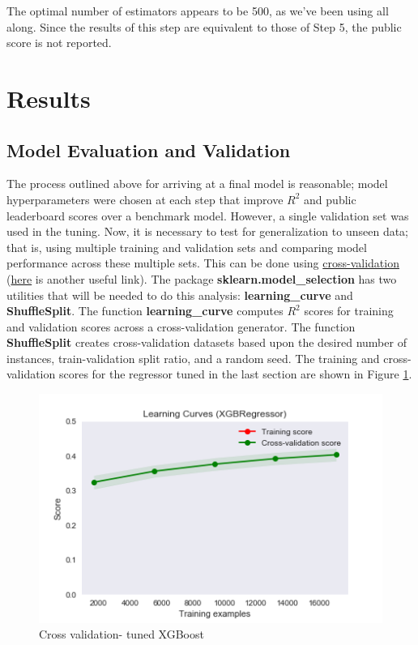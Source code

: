 \documentclass[12pt]{article}
\theoremstyle{plain} %
\theoremstyle{definition} %
\theoremstyle{remark} %
\begin{document}
\par The optimal number of estimators appears to be 500, as we've been using all along.  Since the results of this step are equivalent to those of Step 5, the public score is not reported.

\section{Results}

\subsection*{Model Evaluation and Validation}
\indent \par The process outlined above for arriving at a final model is reasonable; model hyperparameters were chosen at each step that improve $R^2$ and public leaderboard scores over a benchmark model.  However, a single validation set was used in the tuning.  Now, it is necessary to test for generalization to unseen data; that is, using multiple training and validation sets and comparing model performance across these multiple sets.  This can be done using \href{http://scikit-learn.org/stable/modules/cross_validation.html}{cross-validation} (\href{https://www.analyticsvidhya.com/blog/2016/01/complete-tutorial-learn-data-science-python-scratch-2/}{here} is another useful link).  The package \textbf{sklearn.model\_selection} has two utilities that will be needed to do this analysis: \textbf{learning\_curve} and \textbf{ShuffleSplit}.  The function \textbf{learning\_curve} computes $R^2$ scores for training and validation scores across a cross-validation generator.  The function \textbf{ShuffleSplit} creates cross-validation datasets based upon the desired number of instances, train-validation split ratio, and a random seed.  The training and cross-validation scores for the regressor tuned in the last section are shown in Figure \ref{fig:fourteen}.

\begin{figure}[h!]
\begin{center}
\includegraphics[width=12cm]{./output_images/xgb_cv.png}
\caption{Cross validation- tuned XGBoost}
\label{fig:fourteen}
\end{center}
\end{figure}
\end{document}
